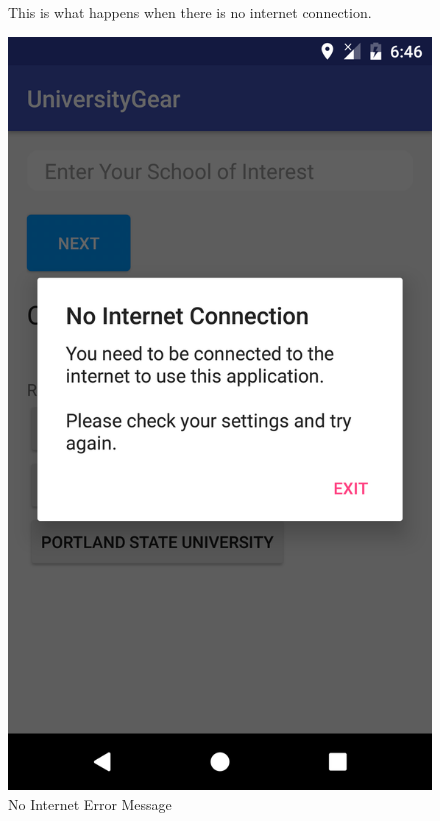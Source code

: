 \documentclass[journal,compsoc, 10pt, draftclsnofoot, onecolumn]{IEEEtran}
\begin{document}
\begin{figure}[!h]
This is what happens when there is no internet connection.
\centering
\caption{No Internet Error Message}
\includegraphics[scale=.15]{noInternetError}
\end{figure}
\FloatBarrier
\end{document}
